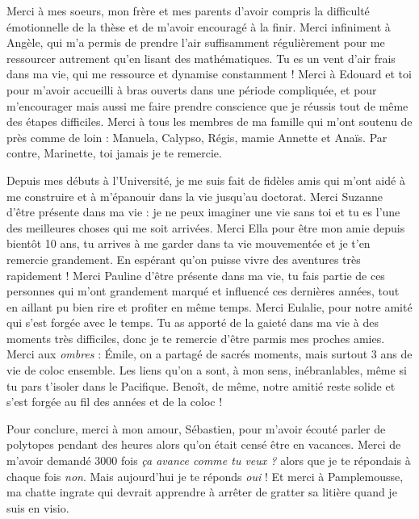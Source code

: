 Merci à mes soeurs, mon frère et mes parents d'avoir compris la difficulté émotionnelle de la thèse et de m'avoir encouragé à la finir.
Merci infiniment à Angèle, qui m'a permis de prendre l'air suffisamment régulièrement pour me ressourcer autrement qu'en lisant des mathématiques. Tu es un vent d'air frais dans ma vie, qui me ressource et dynamise constamment !
Merci à Edouard et toi pour m'avoir accueilli à bras ouverts dans une période compliquée, et pour m'encourager mais aussi me faire prendre conscience que je réussis tout de même des étapes difficiles.
Merci à tous les membres de ma famille qui m'ont soutenu de près comme de loin : Manuela, Calypso, Régis, mamie Annette et Anaïs. Par contre, Marinette, toi jamais je te remercie.

Depuis mes débuts à l'Université, je me suis fait de fidèles amis qui m'ont aidé à me construire et à m'épanouir dans la vie jusqu'au doctorat.
Merci Suzanne d'être présente dans ma vie : je ne peux imaginer une vie sans toi et tu es l'une des meilleures choses qui me soit arrivées. 
Merci Ella pour être mon amie depuis bientôt 10 ans, tu arrives à me garder dans ta vie mouvementée et je t'en remercie grandement. En espérant qu'on puisse vivre des aventures très rapidement !
Merci Pauline d'être présente dans ma vie, tu fais partie de ces personnes qui m'ont grandement marqué et influencé ces dernières années, tout en aillant pu bien rire et profiter en même temps.
Merci Eulalie, pour notre amité qui s'est forgée avec le temps. Tu as apporté de la gaieté dans ma vie à des moments 
très difficiles, donc je te remercie d'être parmis mes proches amies. Merci aux \emph{ombres} : Émile, on a partagé de sacrés moments, mais surtout 3 ans de vie de coloc ensemble. Les liens qu'on a sont, à mon sens, inébranlables, même si tu pars t'isoler dans le Pacifique. 
Benoît, de même, notre amitié reste solide et s'est forgée au fil des années et de la coloc !

Pour conclure, merci à mon amour, Sébastien, pour m'avoir écouté parler de polytopes pendant des heures alors qu'on était censé être en vacances. 
Merci de m'avoir demandé 3000 fois \emph{ça avance comme tu veux ?} alors que je te répondais à chaque fois \emph{non}. 
Mais aujourd'hui je te réponds \emph{oui} ! 
Et merci à Pamplemousse, ma chatte ingrate qui devrait apprendre à arrêter de gratter sa litière quand je suis en visio.

